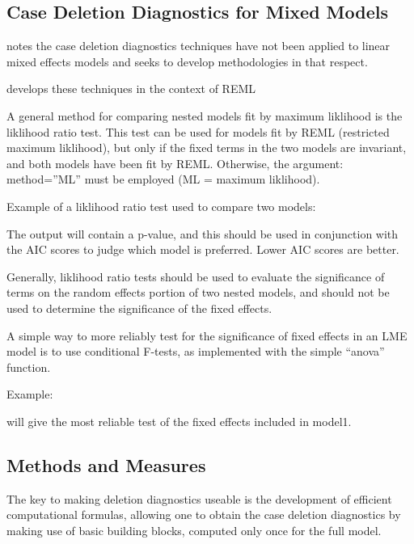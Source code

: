 \documentclass[12pt, a4paper]{report}
\theoremstyle{plain}
\theoremstyle{definition}
\theoremstyle{remark}
\begin{document}
	
	
	
	\subsection{Case Deletion Diagnostics for Mixed Models}
	
	\citet{Christiansen} notes the case deletion diagnostics techniques have not been applied to linear mixed effects models and seeks to develop methodologies in that respect.
	
	\citet{Christiansen} develops these techniques in the context of REML
	
	
	
	
	
	A general method for comparing nested models fit by maximum liklihood is the liklihood ratio 
	test. This test can be used for models fit by REML (restricted maximum liklihood), but only if the 
	fixed terms in the two models are invariant, and both models have been fit by REML. Otherwise, 
	the argument: method=”ML” must be employed (ML = maximum liklihood). 
	
	Example of a liklihood ratio test used to compare two models: 
	
	
	
	The output will contain a p-value, and this should be used in conjunction with the AIC scores to 
	judge which model is preferred. Lower AIC scores are better. 
	
	Generally, liklihood ratio tests should be used to evaluate the significance of terms on the 
	random effects portion of two nested models, and should not be used to determine the 
	significance of the fixed effects. 
	
	A simple way to more reliably test for the significance of fixed effects in an LME model is to use 
	conditional F-tests, as implemented with the simple “anova” function. 
	
	Example: 
	
	will give the most reliable test of the fixed effects included in model1. 
	
	
	\subsection{Methods and Measures}
	The key to making deletion diagnostics useable is the development of efficient computational formulas, allowing one to obtain the  case deletion diagnostics by making use of basic building blocks, computed only once for the full model.
	
\end{document}

